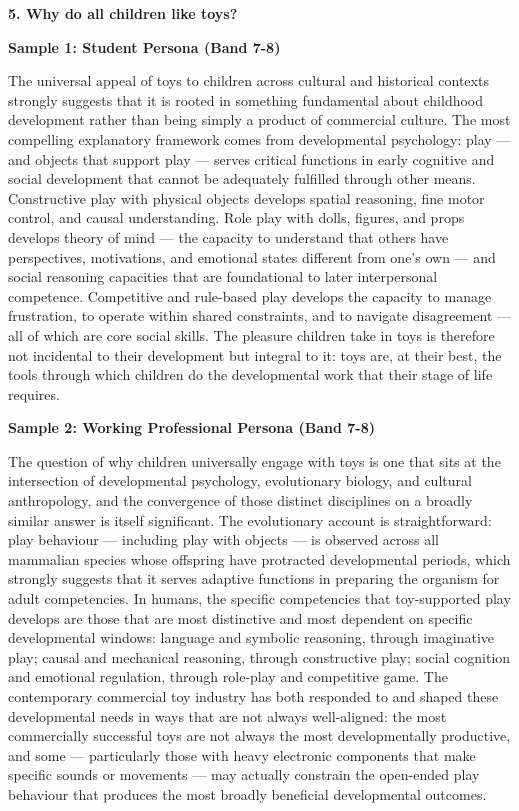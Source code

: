\separator

\begin{ieltsquestion}
\textbf{5. Why do all children like toys?}
\end{ieltsquestion}
\textbf{Sample 1: Student Persona (Band 7-8)}

The universal appeal of toys to children across cultural and historical contexts strongly suggests that it is rooted in something fundamental about childhood development rather than being simply a product of commercial culture. The most compelling explanatory framework comes from developmental psychology: play — and objects that support play — serves critical functions in early cognitive and social development that cannot be adequately fulfilled through other means. Constructive play with physical objects develops spatial reasoning, fine motor control, and causal understanding. Role play with dolls, figures, and props develops theory of mind — the capacity to understand that others have perspectives, motivations, and emotional states different from one's own — and social reasoning capacities that are foundational to later interpersonal competence. Competitive and rule-based play develops the capacity to manage frustration, to operate within shared constraints, and to navigate disagreement — all of which are core social skills. The pleasure children take in toys is therefore not incidental to their development but integral to it: toys are, at their best, the tools through which children do the developmental work that their stage of life requires.

\textbf{Sample 2: Working Professional Persona (Band 7-8)}

The question of why children universally engage with toys is one that sits at the intersection of developmental psychology, evolutionary biology, and cultural anthropology, and the convergence of those distinct disciplines on a broadly similar answer is itself significant. The evolutionary account is straightforward: play behaviour — including play with objects — is observed across all mammalian species whose offspring have protracted developmental periods, which strongly suggests that it serves adaptive functions in preparing the organism for adult competencies. In humans, the specific competencies that toy-supported play develops are those that are most distinctive and most dependent on specific developmental windows: language and symbolic reasoning, through imaginative play; causal and mechanical reasoning, through constructive play; social cognition and emotional regulation, through role-play and competitive game. The contemporary commercial toy industry has both responded to and shaped these developmental needs in ways that are not always well-aligned: the most commercially successful toys are not always the most developmentally productive, and some — particularly those with heavy electronic components that make specific sounds or movements — may actually constrain the open-ended play behaviour that produces the most broadly beneficial developmental outcomes.


